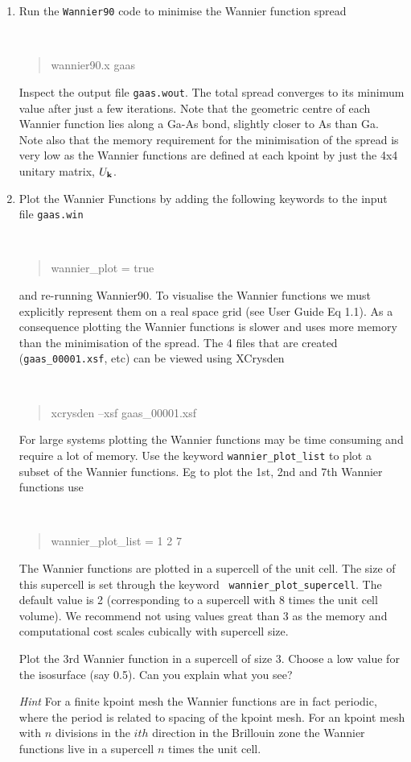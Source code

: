 \documentclass[a4paper,11pt,twoside]{article}
\begin{document}
\begin{enumerate}
\item Run the {\tt Wannier90} code to minimise the Wannier function spread
{\tt
\begin{quote}
wannier90.x gaas
\end{quote} }
Inspect the output file {\tt gaas.wout}. The total spread converges to its
minimum value after just a few iterations. Note that the geometric centre of
each Wannier function lies along a Ga-As bond, slightly closer to As
than Ga. Note also that the memory requirement for the minimisation of
the spread is very low as the Wannier functions are defined at each
kpoint by just the 4x4 unitary matrix, $U_{{\bf k}}$. 
\item Plot the Wannier Functions by adding the following keywords to the input file {\tt gaas.win}
{\tt
\begin{quote}
wannier\_plot = true
\end{quote} }
and re-running Wannier90. To visualise the Wannier functions we must explicitly represent them on
a real space grid (see User Guide Eq 1.1). As a consequence plotting the
Wannier functions is slower and uses more memory than the minimisation
of the spread. The 4 files that are created ({\tt gaas\_00001.xsf}, etc) can
be viewed using XCrysden 
{\tt
\begin{quote}
xcrysden --xsf gaas\_00001.xsf
\end{quote} }

For large systems plotting the Wannier functions may be time consuming
and require a lot of memory. Use the keyword {\tt wannier\_plot\_list}
to plot a subset of the Wannier functions. Eg to plot the 1st, 2nd and
7th Wannier functions use 
{\tt
\begin{quote}
wannier\_plot\_list = 1 2 7
\end{quote} }
The Wannier functions are plotted in a supercell of the unit cell. The
size of this supercell is set through the keyword {\tt
  wannier\_plot\_supercell}. The default value is 2 (corresponding to a
supercell with 8 times the unit cell volume). We recommend not using
values great than 3 as the memory and computational cost scales
cubically with  supercell size.  

Plot the 3rd Wannier function in a supercell of size 3. Choose a low
value for the isosurface (say 0.5). Can you explain what you see? 


{\it Hint} For a finite kpoint mesh the Wannier functions are in fact
periodic, where the period is related to spacing of the kpoint mesh. For
an kpoint mesh with $n$ divisions in the $ith$ direction in the
Brillouin zone the Wannier functions live in a supercell $n$ times the
unit cell. 
\end{enumerate}
\end{document}
